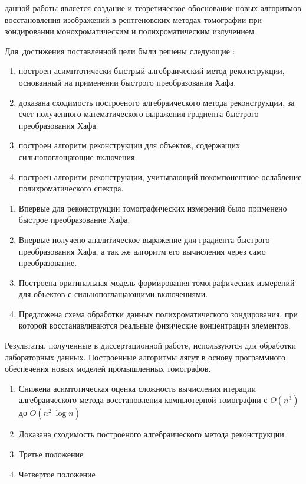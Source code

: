 \aim данной работы является создание и теоретическое обоснование новых алгоритмов восстановления изображений в рентгеновских методах томографии при зондировании монохроматическим и полихроматическим излучением.

Для~достижения поставленной цели были решены следующие {\tasks}:
\begin{enumerate}
  \item построен асимптотически быстрый алгебраический метод реконструкции, основанный на применении быстрого преобразования Хафа.
  \item доказана сходимость построеного алгебраического метода реконструкции, за счет полученного математического выражения градиента быстрого преобразования Хафа.
  \item построен алгоритм реконструкции для объектов, содержащих сильнопоглощающие включения.
  \item построен алгоритм реконструкции, учитывающий покомпонентное ослабление полихроматического спектра.
\end{enumerate}

{\novelty}
\begin{enumerate}
  \item Впервые для реконструкции томографических измерений было применено быстрое преобразование Хафа.
  \item Впервые получено аналитическое выражение для градиента быстрого преобразования Хафа, а так же алгоритм его вычисления через само преобразование.
  \item Построена оригинальная модель формирования томографических измерений для объектов с сильнопоглащающими включениями.
  \item Предложена схема обработки данных полихроматического зондирования, при которой восстанавливаются реальные физические концентрации элементов.
\end{enumerate}
{\influence} Результаты, полученные в диссертационной работе, используются для обработки лабораторных данных. Построенные алгоритмы лягут в основу программного обеспечения новых моделей промышленных томографов.

{}
\begin{enumerate}
  \item Снижена асимтотическая оценка сложность вычисления итерации алгебраического метода восстановления компьютерной томографии с $O(n^3)$ до $O(n^2~\log n)$
  \item Доказана сходимость построеного алгебраического метода реконструкции. 
  \item Третье положение
  \item Четвертое положение
\end{enumerate}


